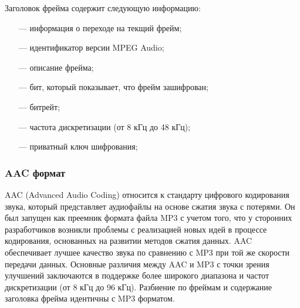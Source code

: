 		\par Заголовок фрейма содержит следующую информацию:
		\begin{itemize}
			\item[---] информация о переходе на текщий фрейм;
			\item[---] идентификатор версии MPEG Audio;
			\item[---] описание фрейма;
			\item[---] бит, который показывает, что фрейм зашифрован;
			\item[---] битрейт;
			\item[---] частота дискретизации (от 8 кГц до 48 кГц);
			\item[---] приватный ключ шифрования;
		\end{itemize}
	
	\subsubsection{AAC формат}
		\par AAC (Advanced Audio Coding) относится к стандарту цифрового кодирования звука, который представляет аудиофайлы на основе сжатия звука с потерями. 
		Он был запущен как преемник формата файла MP3 с учетом того, что у сторонних разработчиков возникли проблемы с реализацией новых идей в процессе кодирования, основанных на развитии методов сжатия данных. 
		AAC обеспечивает лучшее качество звука по сравнению с MP3 при той же скорости передачи данных. 
		Основные различия между AAC и MP3 с точки зрения улучшений заключаются в поддержке более широкого диапазона и частот дискретизации (от 8 кГц до 96 кГц).
		Разбиение по фреймам и содержание заголовка фрейма идентичны с MP3 форматом.
		
